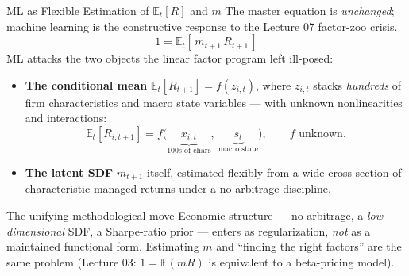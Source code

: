 \documentclass{beamer}
\newcommand{\E}{\mathbb{E}}
\begin{document}
\begin{frame}{ML as Flexible Estimation of \texorpdfstring{$\E_t[R]$}{Et[R]} and \texorpdfstring{$m$}{m}}
The master equation is \emph{unchanged}; machine learning is the constructive response to the Lecture 07 factor-zoo crisis.
\begin{equation*}
1 = \E_t\!\left[\, m_{t+1}\, R_{t+1}\,\right]
\end{equation*}
ML attacks the two objects the linear factor program left \alert{ill-posed}:
\begin{itemize}
  \item \textbf{The conditional mean} $\E_t[R_{t+1}] = f(z_{i,t})$, where $z_{i,t}$ stacks \emph{hundreds} of firm characteristics and macro state variables --- with \alert{unknown nonlinearities and interactions}:
  \begin{equation*}
    \E_t[R_{i,t+1}] = f\big(\underbrace{x_{i,t}}_{\text{100s of chars}},\ \underbrace{s_t}_{\text{macro state}}\big), \qquad f \text{ unknown}.
  \end{equation*}
  \item \textbf{The latent SDF} $m_{t+1}$ itself, estimated flexibly from a wide cross-section of characteristic-managed returns under a no-arbitrage discipline.
\end{itemize}
\begin{block}{The unifying methodological move}
Economic structure --- no-arbitrage, a \emph{low-dimensional} SDF, a Sharpe-ratio prior --- enters as \alert{regularization}, \textit{not} as a maintained functional form. Estimating $m$ and ``finding the right factors'' are the same problem (Lecture 03: $1=\E(mR)$ is equivalent to a beta-pricing model).
\end{block}
\end{frame}
\end{document}
